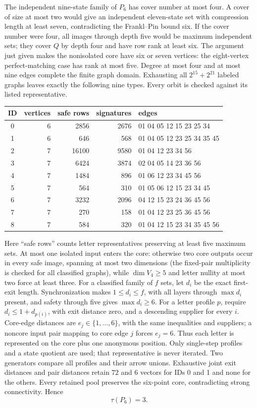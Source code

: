 \documentclass[10pt]{article}
\begin{document}
The independent nine-state family of $P_6$ has cover number at most four.
A cover of size at most two would give an independent eleven-state set
with compression length at least seven, contradicting the Frankl--Pin
bound six. If the cover number were four, all images through depth five
would be maximum independent sets; they cover $Q$ by depth four and have
row rank at least six. The argument just given makes the nonisolated core
have six or seven vertices: the eight-vertex perfect-matching case has
rank at most five. Degree at most four and at most nine edges complete the
finite graph domain. Exhausting all $2^{15}+2^{21}$ labeled graphs leaves
exactly the following nine types. Every orbit is checked against its
listed representative.
\begin{center}\small
\begin{tabular}{crrrl}
ID&vertices&safe rows&signatures&edges\\\hline
0&6&2856&2676&01 04 05 12 15 23 25 34\\
1&6&646&568&01 04 05 12 23 25 34 35 45\\
2&7&16100&9580&01 04 12 23 34 56\\
3&7&6424&3874&02 04 05 14 23 36 56\\
4&7&1484&896&01 06 12 23 34 45 56\\
5&7&564&310&01 05 06 12 15 23 34 45\\
6&7&3232&2096&04 12 15 23 24 36 45 56\\
7&7&270&158&01 04 12 23 25 36 45 56\\
8&7&584&320&01 04 12 15 23 34 35 45 56
\end{tabular}
\end{center}
Here ``safe rows'' counts letter representatives preserving at least five
maximum sets. At most one isolated input enters the core: otherwise two
core outputs occur in every safe image, spanning at most two dimensions
(the fixed-pair multiplicity is checked for all classified graphs), while
$\dim V_4\ge5$ and letter nullity at most two force at least three.
For a classified family of $f$ sets, let $d_i$ be the exact first-exit
length. Synchronization makes $1\le d_i\le f$, with all layers through
$\max d_i$ present, and safety through five gives $\max d_i\ge6$.
For a letter profile $p$, require $d_i\le1+d_{p(i)}$, with exit distance
zero, and a descending supplier for every $i$. Core-edge distances are
$e_j\in\{1,\ldots,6\}$, with the same inequalities and suppliers; a
noncore input pair mapping to core edge $j$ forces $e_j=6$.
Thus each letter is represented on the core plus one anonymous position.
Only single-step profiles and a state quotient are used; that representative
is never iterated. Two generators compare all profiles and their arrow
unions. Exhaustive joint exit distances and pair distances retain $72$ and
$6$ vectors for IDs 0 and 1 and none for the others. Every retained pool
preserves the six-point core, contradicting strong connectivity. Hence
\begin{equation}\label{eq:eleven-cover}
 \tau(P_6)=3.
\end{equation}
\end{document}
